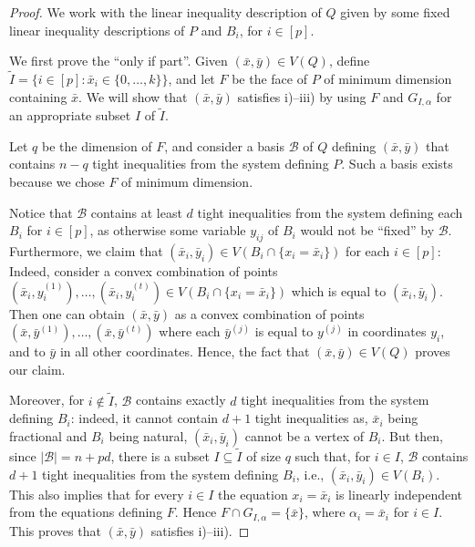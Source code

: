 \documentclass[11pt,a4paper]{article}
\newcommand{\B}{\mathcal{B}}
\newcommand{\1}{\textbf{1}}
\newcommand\manuel[1]{\textcolor{LimeGreen}{\textbf{ MA:  #1}}}
\begin{document}
    \begin{proof}
    We work with the linear inequality description of $Q$ given by some fixed linear inequality descriptions of $P$ and $B_i$, for $i\in [p]$.\medskip
     
     We first prove the ``only if part''.
        Given $(\bar{x},\bar{y})\in V(Q)$, define $\tilde{I}=\{i\in [p]:\bar x_i\in  \{0,\dots,k\}\}$, and let $F$ be the face of $P$ of minimum dimension containing $\bar{x}$. We will show that $(\bar{x},\bar{y})$ satisfies i)--iii) by using $F$ and $G_{I,\alpha}$ for an appropriate subset $I$ of $\tilde{I}$.
        
        Let $q$ be the dimension of $F$, and consider a basis $\B$ of $Q$ defining $(\bar{x}, \bar{y})$ that contains $n-q$   tight inequalities from the system defining $P$. Such a basis exists because we chose $F$ of minimum dimension.
        
        
        Notice that
    $\B$ contains at least $d$ tight inequalities  from the system defining each $B_i$ for $i\in [p]$, as otherwise some variable $y_{ij}$ of $B_i$ would not be ``fixed'' by $\B$. Furthermore, we claim that
    $(\bar{x}_i,\bar{y}_i)\in  V(B_i\cap\{x_i=\bar{x}_i\})$ for each $i\in[p]$: Indeed, consider a convex combination of points $(\bar{x}_i, y^{(1)}_i), \dots, (\bar{x}_i, y^{(t)}_i)\in V(B_i\cap\{x_i=\bar{x}_i\})$ which is equal to $(\bar{x}_i,\bar{y}_i)$. Then one can obtain $(\bar{x},\bar{y})$ as a convex combination of points $(\bar{x},\bar{y}^{(1)}), \dots, (\bar{x},\bar{y}^{(t)})$ where each $\bar{y}^{(j)}$ is equal to $y^{(j)}$ in coordinates $y_i$, and to $\bar{y}$ in  all other coordinates. Hence, the fact that $(\bar{x},\bar{y})\in V(Q)$ proves our claim.
    
    Moreover, for $i\notin \tilde{I}$, $\B$ contains exactly $d$ tight inequalities 
    from the system defining $B_i$: indeed, it cannot contain $d+1$ tight inequalities as, $\bar{x}_i$ being fractional and $B_i$ being natural, $(\bar{x}_i,\bar{y}_i)$ cannot be a vertex of $B_i$. But then, since $|\B|=n+pd$, there is a subset $I\subseteq \tilde{I}$ of size $q$ such that, for $i\in I$, $\B$ contains $d+1$ tight inequalities from the system defining $B_i$, i.e., $(\bar{x}_i,\bar{y}_i)\in V(B_i)$. This also implies that for every $i\in I$ the equation $x_i=\bar{x}_i$ is linearly independent from the equations defining $F$. Hence  $F\cap G_{I,\alpha}=\{\bar{x}\}$, where $\alpha_i=\bar{x}_i$ for $i\in I$.      This proves that $(\bar{x},\bar{y})$ satisfies i)--iii).\medskip
    

\end{proof}
\end{document}
